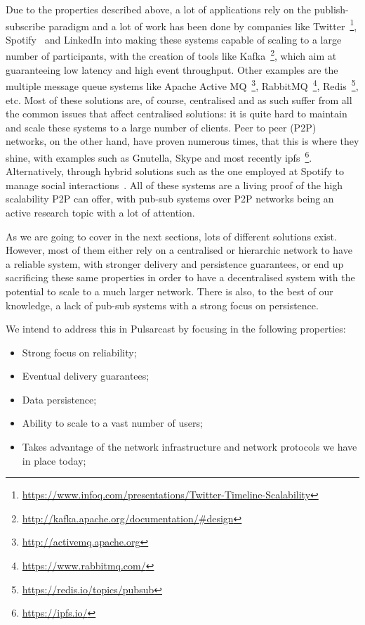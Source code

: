 Due to the properties described above, a lot of applications rely on the
publish-subscribe paradigm and a lot of work has been done by companies like
Twitter~\footnote{\url{https://www.infoq.com/presentations/Twitter-Timeline-Scalability}},
Spotify~\cite{Setty2013} and LinkedIn into making these systems capable of
scaling to a large number of participants, with the creation of tools like
Kafka~\footnote{\url{http://kafka.apache.org/documentation/\#design}}, which
aim at guaranteeing low latency and high event throughput. Other examples are
the multiple message queue systems like Apache Active
MQ~\footnote{\url{http://activemq.apache.org}},
RabbitMQ~\footnote{\url{https://www.rabbitmq.com/}},
Redis~\footnote{\url{https://redis.io/topics/pubsub}}, etc. Most of these
solutions are, of course, centralised and as such suffer from all the common
issues that affect centralised solutions: it is quite hard to maintain and
scale these systems to a large number of clients. Peer to peer (P2P) networks,
on the other hand, have proven numerous times, that this is where they shine,
with examples such as Gnutella, Skype and most recently
ipfs~\footnote{\url{https://ipfs.io/}}. Alternatively, through
hybrid solutions such as the one employed at Spotify to manage social
interactions~\cite{Setty2013}. All of these systems are a
living proof of the high scalability P2P can offer, with pub-sub
systems over P2P networks being an active research topic with a lot
of attention.

As we are going to cover in the next sections, lots of different solutions
exist. However, most of them either rely on a centralised or hierarchic network
to have a reliable system, with stronger delivery and persistence guarantees,
or end up sacrificing these same properties in order to have a decentralised
system with the potential to scale to a much larger network. There is also, to
the best of our knowledge, a lack of pub-sub systems with a strong focus on
persistence.

We intend to address this in Pulsarcast by focusing in the following
properties:

\begin{itemize}
  \item
    Strong focus on reliability;
  \item
    Eventual delivery guarantees;
  \item
    Data persistence;
  \item
    Ability to scale to a vast number of users;
  \item
    Takes advantage of the network infrastructure and network protocols we have in place today;
\end{itemize}

